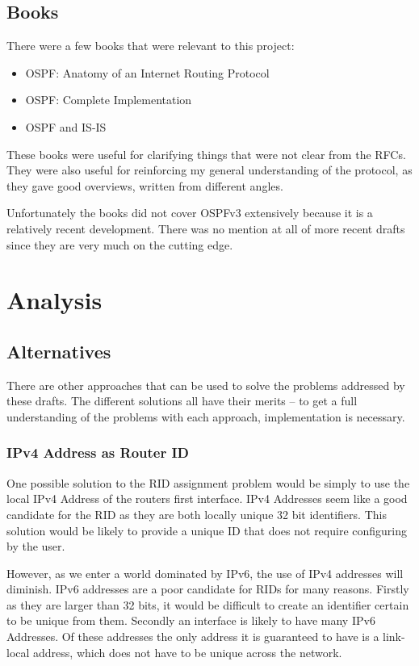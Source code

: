 \section{Books}
There were a few books that were relevant to this project:
\begin{itemize}
  \item OSPF: Anatomy of an Internet Routing Protocol \cite{OSPFAIRP}
  \item OSPF: Complete Implementation \cite{OSPFCI}
  \item OSPF and IS-IS \cite{OSPFvsISIS}
\end{itemize}

These books were useful for clarifying things that were not clear from the
RFCs. They were also useful for reinforcing my general understanding of the
protocol, as they gave good overviews, written from different angles. 

Unfortunately the books did not cover OSPFv3 extensively because it is a
relatively recent development. There was no mention at all of more recent
drafts since they are very much on the cutting edge.

\chapter{Analysis}
\section{Alternatives}
There are other approaches that can be used to solve the problems addressed by
these drafts. The different solutions all have their merits -- to get a full
understanding of the problems with each approach, implementation is necessary.

\subsection{IPv4 Address as Router ID}
One possible solution to the RID assignment problem would be simply to use the
local IPv4 Address of the routers first interface. IPv4 Addresses seem like a
good candidate for the RID as they are both locally unique 32 bit identifiers.
This solution would be likely to provide a unique ID that does not require
configuring by the user.
 
However, as we enter a world dominated by IPv6, the use of IPv4 addresses will
diminish. IPv6 addresses are a poor candidate for RIDs for many reasons.
Firstly as they are larger than 32 bits, it would be difficult to create an
identifier certain to be unique from them. Secondly an interface is likely to
have many IPv6 Addresses. Of these addresses the only address it is guaranteed
to have is a link-local address, which does not have to be unique across the
network. 

